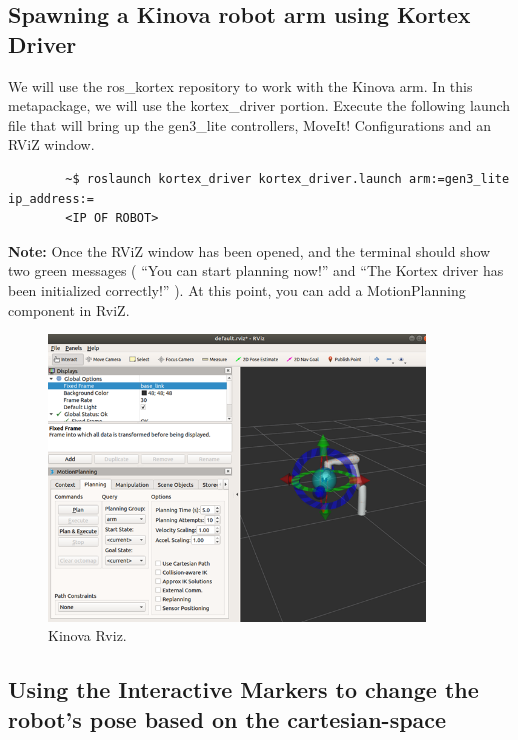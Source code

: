 \documentclass[12pt]{article}
\begin{document}
\begin{enumerate}
\begin{enumerate}
    \end{enumerate}
\end{enumerate}


\subsection{Spawning a Kinova robot arm using Kortex Driver}

We will use the ros\_kortex repository to work with the Kinova arm. In this metapackage, we will use the kortex\_driver portion. Execute the following launch file that will bring up the gen3\_lite controllers, MoveIt! Configurations and an RViZ window.

\begin{verbatim}
        ~$ roslaunch kortex_driver kortex_driver.launch arm:=gen3_lite ip_address:=
        <IP OF ROBOT>
    \end{verbatim}

\textbf{Note:} Once the RViZ window has been opened, and the terminal should show two green messages ( “You can start planning now!” and “The Kortex driver has been initialized correctly!” ). At this point, you can add a MotionPlanning component in RviZ.

\begin{figure}[H]
    \centering\includegraphics[width=10cm]{images/kinovaRviz.png}
    \caption{Kinova Rviz.}\label{fig:kinovarviz}\vspace{-10pt}
    \end{figure}


\subsection{Using the Interactive Markers to change the robot’s pose based on the cartesian-space}
\end{document}
